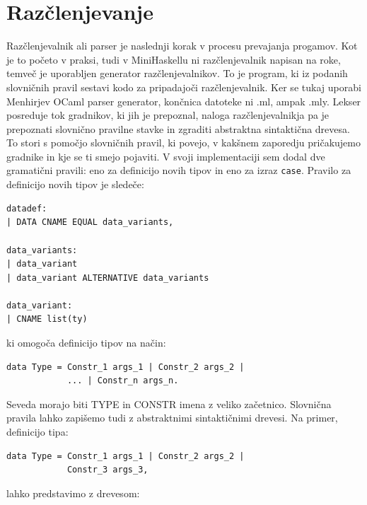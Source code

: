 \documentclass[a4paper,12pt,openright]{book}
\begin{document}
\section{Razčlenjevanje}
Razčlenjevalnik ali parser je naslednji korak v procesu prevajanja progamov. Kot je to početo v praksi, tudi v MiniHaskellu ni razčlenjevalnik napisan na roke, temveč 
je uporabljen generator razčlenjevalnikov. To je program, ki iz podanih slovničnih pravil sestavi kodo za pripadajoči razčlenjevalnik. Ker se tukaj uporabi Menhirjev OCaml parser generator, končnica 
datoteke ni .ml, ampak .mly. Lekser posreduje tok gradnikov, ki jih je prepoznal, naloga razčlenjevalnikja pa je prepoznati slovnično pravilne stavke in zgraditi 
abstraktna sintaktična drevesa. To stori s pomočjo slovničnih pravil, ki povejo, v kakšnem zaporedju pričakujemo gradnike in kje se ti smejo pojaviti. 
V svoji implementaciji sem dodal dve gramatični pravili: eno za definicijo novih tipov in eno za izraz \lstinline{case}. Pravilo za definicijo novih tipov je 
sledeče:
\begin{lstlisting}
datadef:
| DATA CNAME EQUAL data_variants,

data_variants:
| data_variant
| data_variant ALTERNATIVE data_variants

data_variant:
| CNAME list(ty)
\end{lstlisting}
ki omogoča definicijo tipov na način:
\begin{lstlisting}
data Type = Constr_1 args_1 | Constr_2 args_2 | 
            ... | Constr_n args_n.
\end{lstlisting}
Seveda morajo biti TYPE in CONSTR imena z veliko začetnico. Slovnična pravila lahko zapišemo tudi z abstraktnimi sintaktičnimi drevesi. Na primer, 
definicijo tipa:
\begin{lstlisting}
data Type = Constr_1 args_1 | Constr_2 args_2 | 
            Constr_3 args_3,
\end{lstlisting}
lahko predstavimo z drevesom:
\begin{center}
\end{center}
\end{document}
